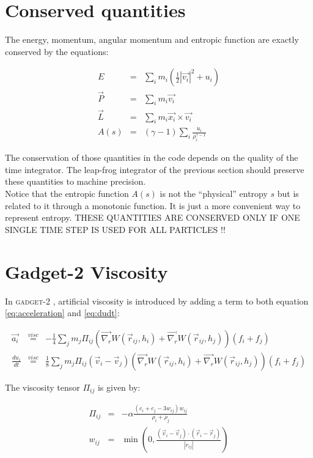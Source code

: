 \documentclass[a4paper,10pt]{report}
\newcommand{\gadget}{\textsc{gadget-2 }}
\begin{document}
\section{Conserved quantities}

The energy, momentum, angular momentum and entropic function are exactly conserved by the equations:

\begin{eqnarray}
E &=&\sum_i m_i\left(\frac{1}{2}|\vec{v_i}|^2+u_i\right)\\
\vec{P} &=&\sum_i m_i \vec{v_i}\\
\vec{L} &=& \sum_i m_i \vec{x_i} \times \vec{v_i}\\ 
A(s) &=& \left(\gamma -1 \right)\sum_i \frac{u_i}{\rho_i^{\gamma - 1}}
\end{eqnarray}

The conservation of those quantities in the code depends on the quality of the time integrator. The leap-frog
integrator of the previous section should preserve these quantities to machine precision.\\
Notice that the entropic function $A(s)$ is not the ``physical'' entropy $s$ but is related to it through a monotonic
function. It is just a more convenient way to represent entropy.
THESE QUANTITIES ARE CONSERVED ONLY IF ONE SINGLE TIME STEP IS USED FOR ALL PARTICLES !!


\section{Gadget-2 Viscosity}

 In \gadget, artificial viscosity is introduced by adding a term to both equation \ref{eq:acceleration} and
\ref{eq:dudt}:

\begin{eqnarray*}
  \vec{a_i} &\stackrel{visc}{=}& -\frac{1}{4}\sum_j m_j \Pi_{ij} \left(\vec{\nabla_r}W(\vec{r}_{ij},
h_i)+\vec{\nabla_r}W(\vec{r}_{ij}, h_j)\right) (f_i+f_j)\\
  \frac{du_i}{dt} &\stackrel{visc}{=}& \frac{1}{8} \sum_j m_j \Pi_{ij}(\vec{v}_i - \vec{v}_j)
\left(\vec{\nabla_r}W(\vec{r}_{ij},
h_i)+\vec{\nabla_r}W(\vec{r}_{ij}, h_j)\right) (f_i+f_j)
\end{eqnarray*}

The viscosity tensor $\Pi_{ij}$ is given by:

\begin{eqnarray*}
 \Pi_{ij} &=& -\alpha \frac{\left(c_i + c_j - 3w_{ij}\right)w_{ij}}{\rho_i + \rho_j} \\
 w_{ij} &=& \min\left(0, \frac{(\vec{v}_i - \vec{v}_j)\cdot(\vec{r}_i - \vec{r}_j)}{|r_{ij}|}\right)
\end{eqnarray*}
\end{document}
